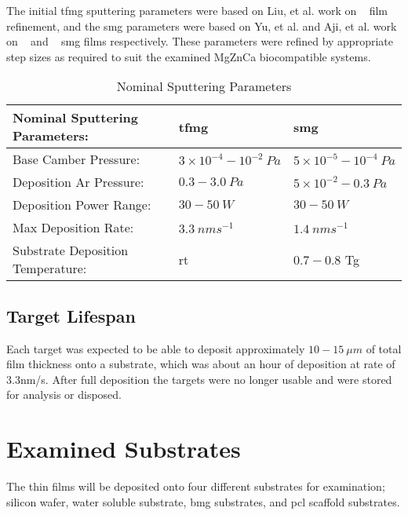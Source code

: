 \documentclass[a4paper,12pt,oneside]{report}%
\begin{document}
The initial \gls{tfmg} sputtering parameters were based on Liu, et al. \cite{Liu2012} work on \ZrCuNiAl~ film refinement, and the \gls{smg} parameters were based on Yu, et al. \cite{Yu2013} and Aji, et al. \cite{Aji2013} work on \ZrCuAl~ and \ZrCuNiAl~ \gls{smg} films respectively. These parameters were refined by appropriate step sizes as required to suit the examined MgZnCa biocompatible systems. 

\begin{table}[h]
	\centering
	\begin{tabular}{ l l l }
		\toprule
		Nominal Sputtering Parameters: & \acrshort{tfmg} & \acrshort{smg} \\
		\midrule
		Base Camber Pressure: & $3 \times 10^{-4} - 10^{-2}~ Pa$ & $5 \times 10^{-5} - 10^{-4}~ Pa$ \\
		Deposition Ar Pressure:	& $0.3 - 3.0~ Pa$ & $5\times 10^{-2} - 0.3~ Pa$\\
		Deposition Power Range:	& $30 - 50~ W$ & $30 - 50~ W$\\
		Max Deposition Rate: & $3.3~ nm s^{-1}$ & $1.4~ nm s^{-1}$ \\	 
		Substrate Deposition Temperature: & \acrshort{rt} & $0.7 - 0.8$ \acrshort{Tg} \\
		\bottomrule
	\end{tabular}
	\caption{Nominal Sputtering Parameters}
	\label{tab:NomSputterParameters}
\end{table}  	

\subsection{Target Lifespan}
Each target was expected to be able to deposit approximately $10 - 15~ \mu m$ of total film thickness onto a substrate, which was about an hour of deposition at rate of 3.3nm/s. After full deposition the targets were no longer usable and were stored for analysis or disposed. 

\section{Examined Substrates} 
The thin films will be deposited onto four different substrates for examination; silicon wafer, water soluble substrate, \gls{bmg} substrates, and \gls{pcl} scaffold substrates.
\end{document}
